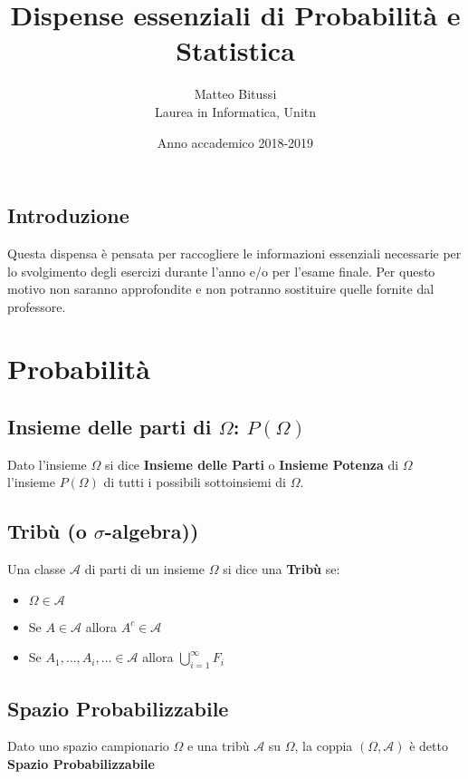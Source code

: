 \documentclass[a4paper]{report}
\title{Dispense essenziali di Probabilità e Statistica}
\author{Matteo Bitussi \\ Laurea in Informatica, Unitn}
\date{Anno accademico 2018-2019}
\begin{document}
  \maketitle

  \tableofcontents

  \section*{Introduzione}
  Questa dispensa è pensata per raccogliere le informazioni essenziali necessarie per lo svolgimento degli esercizi durante l'anno e/o per l'esame finale. Per questo motivo non saranno approfondite e non potranno sostituire quelle fornite dal professore.

  \chapter{Probabilità}

  \section{Insieme delle parti di $\Omega$: $P(\Omega)$}
  Dato l'insieme $\Omega$ si dice \textbf{Insieme delle Parti} o \textbf{Insieme Potenza} di $\Omega$ l'insieme $P(\Omega)$ di tutti i possibili sottoinsiemi di $\Omega$.

  \section{Tribù (o $\sigma$-algebra))}
  Una classe $\mathcal{A}$ di parti di un insieme $\Omega$ si dice una \textbf{Tribù} se:\\
  \begin{itemize}
  \item $\Omega \in \mathcal{A}$
  \item Se $A \in \mathcal{A}$ allora $A^c \in \mathcal{A}$
  \item Se $A_1, \dots ,A_i, \dots \in \mathcal{A}$ allora $\bigcup\limits_{i=1}^{\infty} F_{i}$
  \end{itemize}

  \section{Spazio Probabilizzabile}
  Dato uno spazio campionario $\Omega$ e una tribù $\mathcal{A}$ su $\Omega$, la coppia $(\Omega,\mathcal{A})$ è detto \textbf{Spazio Probabilizzabile}
\end{document}
